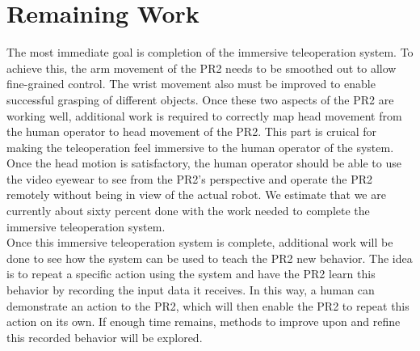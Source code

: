 \documentclass{sig-alternate}
\begin{document}
\section{Remaining Work}
\label{sec:remaining_work}
\indent The most immediate goal is completion of the immersive teleoperation system. To achieve this, the arm movement of the PR2 needs to be smoothed out to allow fine-grained control. The wrist movement also must be improved to enable successful grasping of different objects. Once these two aspects of the PR2 are working well, additional work is required to correctly map head movement from the human operator to head movement of the PR2. This part is cruical for making the teleoperation feel immersive to the human operator of the system. Once the head motion is satisfactory, the human operator should be able to use the video eyewear to see from the PR2's perspective and operate the PR2 remotely without being in view of the actual robot. We estimate that we are currently about sixty percent done with the work needed to complete the immersive teleoperation system.\\
\indent Once this immersive teleoperation system is complete, additional work will be done to see how the system can be used to teach the PR2 new behavior. The idea is to repeat a specific action using the system and have the PR2 learn this behavior by recording the input data it receives. In this way, a human can demonstrate an action to the PR2, which will then enable the PR2 to repeat this action on its own. If enough time remains, methods to improve upon and refine this recorded behavior will be explored.
\end{document}
